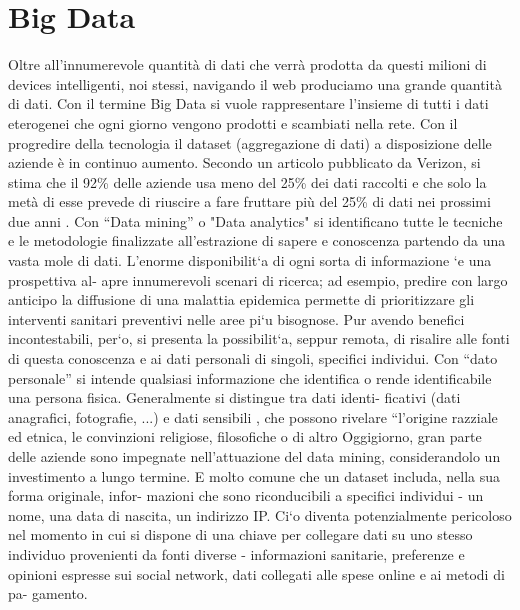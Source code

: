\section{Big Data}
Oltre all'innumerevole quantità di dati che verrà prodotta da questi milioni di
devices intelligenti, noi stessi,  navigando il web produciamo una grande
quantità di dati. Con il  termine Big Data si vuole rappresentare l'insieme di
tutti i dati eterogenei che ogni giorno vengono prodotti e scambiati nella rete.
Con il progredire della tecnologia il dataset (aggregazione di dati) a
disposizione delle aziende è in continuo aumento.
Secondo un articolo pubblicato da Verizon, si stima che il 92\% delle aziende
usa meno del 25\% dei dati raccolti e che solo la metà  di esse prevede di
riuscire a fare fruttare più del 25\% di dati nei prossimi due anni
\cite{Verizon}.  Con “Data mining” o "Data analytics"  si identificano tutte le
tecniche e le metodologie finalizzate all’estrazione di sapere e conoscenza
partendo da una vasta mole di dati.
L’enorme disponibilit`a di ogni sorta di informazione `e una prospettiva al-
apre innumerevoli scenari di ricerca; ad esempio, predire con largo anticipo la
diffusione di una malattia epidemica permette di prioritizzare gli interventi
sanitari preventivi nelle aree pi`u bisognose.  Pur avendo benefici
incontestabili, per`o, si presenta la possibilit`a, seppur remota, di risalire
alle fonti di questa conoscenza e ai dati  personali di singoli, specifici
individui.  Con “dato personale” si intende qualsiasi informazione che
identifica o rende identificabile una persona fisica.  Generalmente si distingue
tra dati  identi- ficativi (dati anagrafici, fotografie, ...)  e dati sensibili
, che possono rivelare “l’origine  razziale  ed  etnica,  le  convinzioni
religiose,  filosofiche  o  di  altro Oggigiorno, gran parte delle aziende sono
impegnate nell'attuazione del data mining, considerandolo un investimento a
lungo termine. 
E molto comune che un dataset includa, nella sua forma originale, infor-
mazioni che sono riconducibili a specifici individui - un nome, una data di
nascita, un indirizzo IP. Ci`o diventa potenzialmente pericoloso nel momento
in  cui  si  dispone  di  una  chiave  per  collegare  dati  su  uno  stesso  individuo
provenienti  da  fonti  diverse  -  informazioni  sanitarie,  preferenze  e  opinioni
espresse sui social network, dati collegati alle spese online e ai metodi di pa-
gamento.


